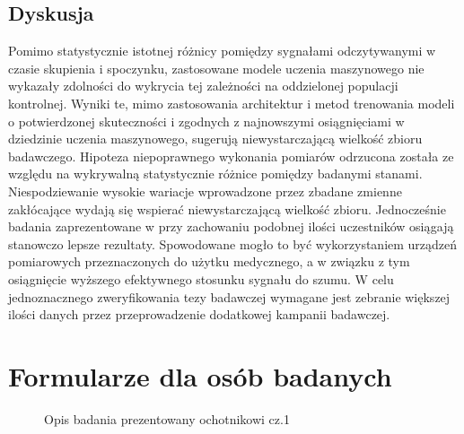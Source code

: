 \documentclass{./assets/wfis}
\begin{document}



\section{Dyskusja}\label{dyskusja}
Pomimo statystycznie istotnej różnicy pomiędzy sygnałami odczytywanymi w czasie skupienia i spoczynku, zastosowane modele uczenia maszynowego nie wykazały zdolności do wykrycia tej zależności na oddzielonej populacji kontrolnej. Wyniki te, mimo zastosowania architektur \cite{} i metod trenowania modeli \cite{} o potwierdzonej skuteczności i zgodnych z najnowszymi osiągnięciami w dziedzinie uczenia maszynowego, sugerują niewystarczającą wielkość zbioru badawczego. Hipoteza niepoprawnego wykonania pomiarów odrzucona została ze względu na wykrywalną statystycznie różnice pomiędzy badanymi stanami. Niespodziewanie wysokie wariacje wprowadzone przez zbadane zmienne zakłócające wydają się wspierać niewystarczającą wielkość zbioru. Jednocześnie badania zaprezentowane w \cite{} przy zachowaniu podobnej ilości uczestników osiągają stanowczo lepsze rezultaty. Spowodowane mogło to być wykorzystaniem urządzeń pomiarowych przeznaczonych do użytku medycznego, a w związku z tym osiągnięcie wyższego efektywnego stosunku sygnału do szumu. W celu jednoznacznego zweryfikowania tezy badawczej wymagane jest zebranie większej ilości danych przez przeprowadzenie dodatkowej kampanii badawczej.

\printbibliography

\clearpage
\listoffigures
\clearpage
\listoftables
\clearpage
\lstlistoflisting
\clearpage

\appendix
\chapter{Formularze dla osób badanych}\label{formularz-dla-osoby-badanej}

\begin{figure}[h!]
    \centering
    \caption{Opis badania prezentowany ochotnikowi cz.1}
    \label{opis-badania}
\end{figure}
\end{document}
